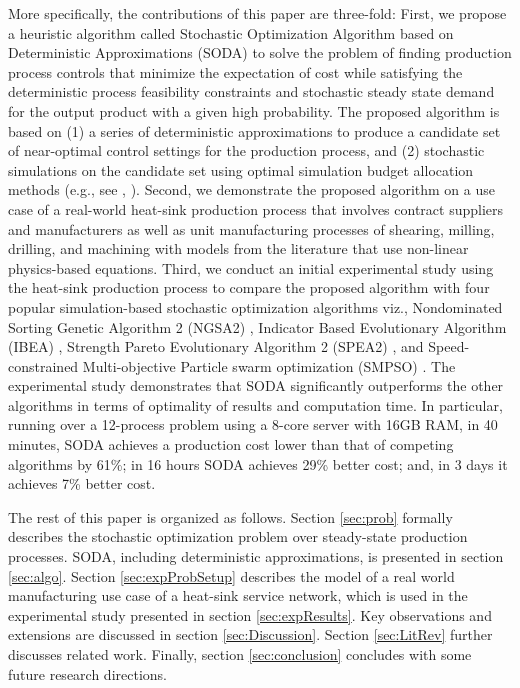 \documentclass[a4paper, 12pt]{article} %
\begin{document}
More specifically, the contributions of this paper are three-fold:
First, we propose a heuristic algorithm called Stochastic Optimization Algorithm based on Deterministic Approximations (SODA) to solve the problem of finding production process controls that minimize the expectation of cost while satisfying the deterministic process feasibility constraints and stochastic steady state demand for the output product with a given high probability. 
The proposed algorithm is based on (1) a series of deterministic approximations to produce a candidate set of near-optimal control settings for the production process, and (2) stochastic simulations on the candidate set using optimal simulation budget allocation methods (e.g., see \cite{Chen2011}, \cite{Lee2012OCBACO}).  
Second, we demonstrate the proposed algorithm on a use case of a real-world heat-sink production process that involves contract suppliers and manufacturers as well as unit manufacturing processes of shearing, milling, drilling, and machining with models from the literature that use non-linear physics-based equations.
Third, we conduct an initial experimental study using the heat-sink production process to compare the proposed algorithm with four popular simulation-based stochastic optimization algorithms viz., Nondominated Sorting Genetic Algorithm 2 (NGSA2) \cite{ngsa2}, Indicator Based Evolutionary Algorithm (IBEA) \cite{ibea}, Strength Pareto Evolutionary Algorithm 2 (SPEA2) \cite{spea2}, and Speed-constrained Multi-objective Particle swarm optimization (SMPSO) \cite{NDG09}.
The experimental study demonstrates that SODA significantly outperforms the other algorithms in terms of optimality of results and computation time. In particular, 
running over a 12-process problem using a 8-core server with 16GB RAM,
in 40 minutes, SODA achieves a production  cost lower than that of competing algorithms by 61\%; in 16 hours SODA achieves 29\% better cost; and, in 3 days it achieves 7\% better cost.

The rest of this paper is organized as follows. Section \ref{sec:prob} formally describes the stochastic optimization problem over steady-state production processes. SODA, including deterministic approximations, is presented in section \ref{sec:algo}. Section \ref{sec:expProbSetup} describes the model of a real world manufacturing use case of a heat-sink service network, which is used in the experimental study presented in section \ref{sec:expResults}. Key observations and extensions are discussed in section \ref{sec:Discussion}. Section \ref{sec:LitRev} further discusses related work. Finally, section \ref{sec:conclusion} concludes with some future research directions. 
\end{document}
